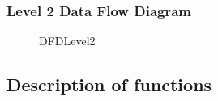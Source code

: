 \documentclass[a4paper,14pt,onecolumn]{report}
\begin{document}
	\subsubsection{Level 2 Data Flow Diagram}
	\begin{center}
		\begin{figure}[!htbp]
			\centering
			\caption{DFDLevel2}
			\label{fig:DFDLevel2}
		\end{figure}
	\end{center} 
	
	\subsection{Description of functions}  
	
	
	
	
	
\end{document}
